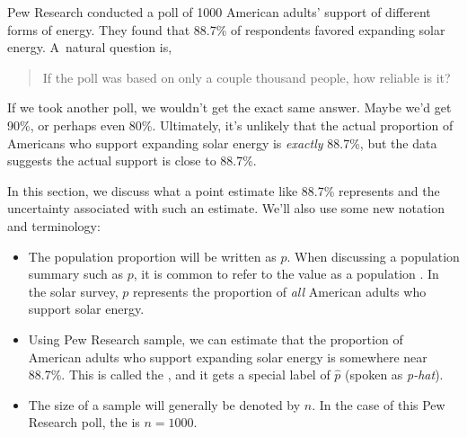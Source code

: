 
\newcommand{\pewsolarpollsize}{1000}
\newcommand{\pewsolarpollprop}{0.887}
\newcommand{\pewsolarpollpropcomplement}{0.113}
\newcommand{\pewsolarpollpercent}{88.7}
\newcommand{\pewsolarpollpercentcomplement}{11.3}
\newcommand{\pewsolarpollcount}{887}
\newcommand{\pewsolarpollcountcomplement}{113}
\newcommand{\pewsolarpollse}{0.0100}

Pew Research conducted a poll of 1000
American adults' support of different forms of energy.
They found that \pewsolarpollpercent{}\% of respondents
favored expanding
solar energy.
A~natural question is,
\begin{quote}
If the poll was based on only a couple thousand people, how reliable is it?
\end{quote}
If we took another poll, we wouldn't get the exact same answer.
Maybe we'd get 90\%, or perhaps even 80\%.
Ultimately, it's unlikely that the actual proportion of Americans
who support expanding solar energy is \emph{exactly}
\pewsolarpollpercent{}\%, but the data suggests the actual
support is close to \pewsolarpollpercent{}\%.

In this section, we discuss what a point estimate like
\pewsolarpollpercent{}\% represents
and the uncertainty associated with such an estimate. We'll also
use some new notation and terminology:
\begin{itemize}
\item The population proportion will be written as $p$.
    When discussing a population summary such as $p$,
    it is common to refer to the value as a population
    .
    In the solar survey,
    $p$ represents the proportion of \emph{all}
    American adults who support solar energy.
\item Using Pew Research sample, we can estimate that the proportion
    of American adults who support expanding solar energy is
    somewhere near \pewsolarpollpercent{}\%.
    This is called the ,
    and it gets a special label of $\hat{p}$
    (spoken as \emph{p-hat}).
\item The size of a sample will generally
    be denoted by $n$. In the case of this Pew Research poll,
    the  is $n = \pewsolarpollsize{}$.
\end{itemize}


